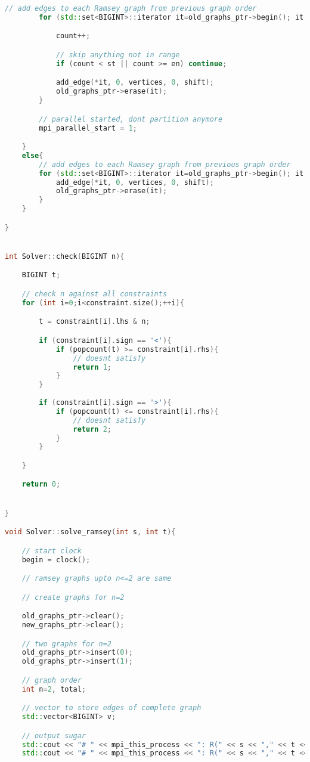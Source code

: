 \documentclass[12pt]{etsu_thesis}
\begin{document}
\begin{lstlisting}[language=C++]
        // add edges to each Ramsey graph from previous graph order
        for (std::set<BIGINT>::iterator it=old_graphs_ptr->begin(); it != old_graphs_ptr->end(); ++it){

            count++;

            // skip anything not in range
            if (count < st || count >= en) continue;

            add_edge(*it, 0, vertices, 0, shift);
            old_graphs_ptr->erase(it);
        }

        // parallel started, dont partition anymore
        mpi_parallel_start = 1;

    }
    else{
        // add edges to each Ramsey graph from previous graph order
        for (std::set<BIGINT>::iterator it=old_graphs_ptr->begin(); it != old_graphs_ptr->end(); ++it){
            add_edge(*it, 0, vertices, 0, shift);
            old_graphs_ptr->erase(it);
        }
    }

}


int Solver::check(BIGINT n){

	BIGINT t;

	// check n against all constraints
	for (int i=0;i<constraint.size();++i){

		t = constraint[i].lhs & n;

		if (constraint[i].sign == '<'){
			if (popcount(t) >= constraint[i].rhs){
				// doesnt satisfy
				return 1;
			}
		}
		
		if (constraint[i].sign == '>'){
			if (popcount(t) <= constraint[i].rhs){
				// doesnt satisfy
				return 2;
			}
		}

	}

	return 0;


}

void Solver::solve_ramsey(int s, int t){

    // start clock
    begin = clock();

    // ramsey graphs upto n<=2 are same

    // create graphs for n=2

    old_graphs_ptr->clear();
    new_graphs_ptr->clear();

    // two graphs for n=2
    old_graphs_ptr->insert(0);
    old_graphs_ptr->insert(1);

    // graph order
    int n=2, total;

    // vector to store edges of complete graph
    std::vector<BIGINT> v;

    // output sugar
    std::cout << "# " << mpi_this_process << ": R(" << s << "," << t << "," << "1) = 1 [0s]" << std::endl;
    std::cout << "# " << mpi_this_process << ": R(" << s << "," << t << "," << "2) = 2 [0s]" << std::endl;


\end{lstlisting}
\end{document}

